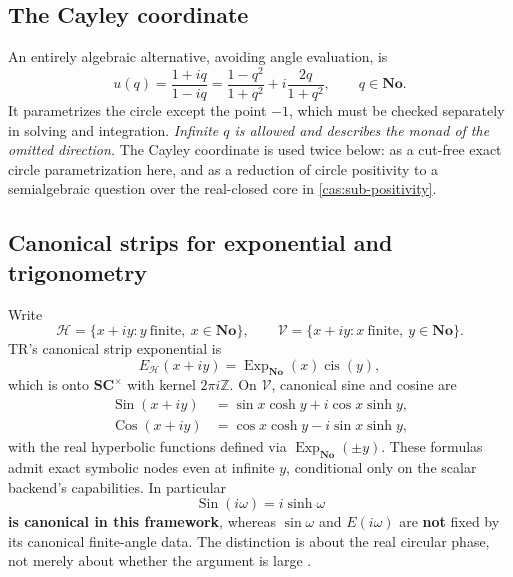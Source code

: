 \documentclass[11pt,letterpaper]{article}
\numberwithin{equation}{section}
\theoremstyle{definition}
\theoremstyle{remark}
\newcommand{\No}{\mathbf{No}}
\newcommand{\SC}{\mathbf{SC}}
\newcommand{\Z}{\mathbb Z}
\newcommand{\HH}{\mathscr H}
\newcommand{\cis}{\operatorname{cis}}
\newcommand{\Sin}{\operatorname{Sin}}
\newcommand{\Cos}{\operatorname{Cos}}
\newcommand{\ExpNo}{\operatorname{Exp}_{\No}}
\begin{document}
\subsection{The Cayley coordinate}
\label{cas:sub-cayley}
An entirely algebraic alternative, avoiding angle evaluation, is
\begin{equation}\label{cas:eq-cayley}
 u(q)=\frac{1+iq}{1-iq}=\frac{1-q^2}{1+q^2}+i\frac{2q}{1+q^2},
 \qquad q\in\No .
\end{equation}
It parametrizes the circle except the point $-1$, which must be checked
separately in solving and integration. \emph{Infinite $q$ is allowed and
describes the monad of the omitted direction.} The Cayley coordinate is used
twice below: as a cut-free exact circle parametrization here, and as a reduction
of circle positivity to a semialgebraic question over the real-closed core in
\cref{cas:sub-positivity}.

\subsection{Canonical strips for exponential and trigonometry}
\label{cas:sub-strips}
Write
\[
 \HH=\{x+iy:y\ \text{finite},\ x\in\No\},\qquad
 \mathscr V=\{x+iy:x\ \text{finite},\ y\in\No\}.
\]
TR's canonical strip exponential is
\begin{equation}\label{cas:eq-stripexp}
 E_{\HH}(x+iy)=\ExpNo(x)\cis(y),
\end{equation}
which is onto $\SC^\times$ with kernel $2\pi i\Z$. On $\mathscr V$, canonical
sine and cosine are
\begin{align}
 \Sin(x+iy)&=\sin x\cosh y+i\cos x\sinh y,\label{cas:eq-stripsin}\\
 \Cos(x+iy)&=\cos x\cosh y-i\sin x\sinh y,\label{cas:eq-stripcos}
\end{align}
with the real hyperbolic functions defined via $\ExpNo(\pm y)$. These formulas
admit exact symbolic nodes even at infinite $y$, conditional only on the scalar
backend's capabilities. In particular
\[
 \Sin(i\omega)=i\sinh\omega
\]
\textbf{is canonical in this framework}, whereas $\sin\omega$ and
$E(i\omega)$ are \textbf{not} fixed by its canonical finite-angle data. The
distinction is about the real circular phase, not merely about whether the
argument is large \cite{cas:SourceTrig}.
\end{document}
